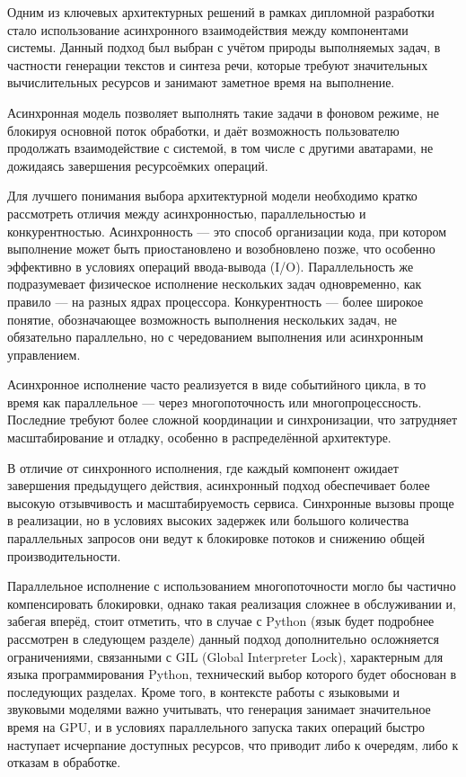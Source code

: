 Одним из ключевых архитектурных решений
в рамках дипломной разработки стало использование асинхронного взаимодействия
между компонентами системы.
Данный подход был выбран с учётом природы выполняемых задач,
в частности генерации текстов и синтеза речи,
которые требуют значительных вычислительных ресурсов
и занимают заметное время на выполнение.

Асинхронная модель позволяет выполнять такие задачи
в фоновом режиме, не блокируя основной поток обработки,
и даёт возможность пользователю
продолжать взаимодействие с системой,
в том числе с другими аватарами,
не дожидаясь завершения ресурсоёмких операций.

Для лучшего понимания выбора архитектурной модели
необходимо кратко рассмотреть отличия между
асинхронностью, параллельностью и конкурентностью.
Асинхронность — это способ организации кода,
при котором выполнение может быть приостановлено и возобновлено позже,
что особенно эффективно в условиях операций ввода-вывода (I/O).
Параллельность же подразумевает физическое исполнение
нескольких задач одновременно, как правило — на разных ядрах процессора.
Конкурентность — более широкое понятие,
обозначающее возможность выполнения нескольких задач,
не обязательно параллельно,
но с чередованием выполнения или асинхронным управлением.

Асинхронное исполнение часто реализуется в виде событийного цикла,
в то время как параллельное — через многопоточность или многопроцессность.
Последние требуют более сложной координации и синхронизации,
что затрудняет масштабирование и отладку,
особенно в распределённой архитектуре.

В отличие от синхронного исполнения,
где каждый компонент ожидает завершения предыдущего действия,
асинхронный подход обеспечивает
более высокую отзывчивость и масштабируемость сервиса.
Синхронные вызовы проще в реализации,
но в условиях высоких задержек
или большого количества параллельных запросов
они ведут к блокировке потоков и снижению общей производительности.

Параллельное исполнение с использованием многопоточности
могло бы частично компенсировать блокировки,
однако такая реализация сложнее в обслуживании
и, забегая вперёд, стоит отметить,
что в случае с Python (язык будет подробнее рассмотрен в следующем разделе)
данный подход дополнительно осложняется ограничениями, связанными с GIL (Global Interpreter Lock),
характерным для языка программирования Python, технический выбор которого будет обоснован в последующих разделах.
Кроме того, в контексте работы с языковыми и звуковыми моделями
важно учитывать, что генерация занимает значительное время на GPU,
и в условиях параллельного запуска таких операций
быстро наступает исчерпание доступных ресурсов,
что приводит либо к очередям, либо к отказам в обработке.

